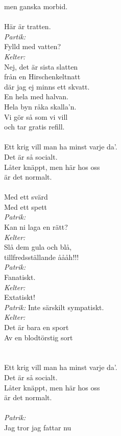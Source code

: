 \documentclass[a6paper, 10pt, twoside]{article}
\begin{document}
\begin{lyrics}
men ganska morbid. \\
\\
Här är tratten. \\
\textit{Partik:}\\
Fylld med vatten? \\
\textit{Kelter:}\\
Nej, det är sista slatten\\
från en Hirschenkeltnatt\\
där jag ej minns ett skvatt.\\
En hela med halvan.\\
Hela byn råka skalla’n.\\
Vi gör så som vi vill\\
och tar gratis refill.\\
\\
Ett krig vill man ha minst varje da’. \\
Det är så socialt.\\
Låter knäppt, men här hos oss\\
är det normalt.\\
\\
Med ett svärd\\
Med ett spett\\
\textit{Patrik:}\\
Kan ni laga en rätt?\\
\textit{Kelter:}\\
Slå dem gula och blå, \\
tillfredsställande åååh!!!\\
\textit{Patrik:}\\
Fanatiskt. \\
\textit{Kelter:}\\
Extatiskt!\\
\textit{Patrik:}
Inte särskilt sympatiskt.\\
\textit{Kelter:}\\
Det är bara en sport\\
Av en blodtörstig sort\\
\\
\\
Ett krig vill man ha minst varje da’. \\
Det är så socialt.\\
Låter knäppt, men här hos oss\\
är det normalt.\\
\\
\textit{Patrik:}\\
Jag tror jag fattar nu\\

\end{lyrics}
\end{document}
